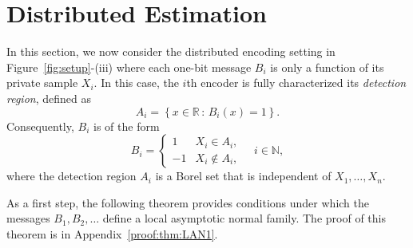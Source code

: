 \section{Distributed Estimation \label{sec:distributed}}
In this section, we now consider the distributed encoding setting in Figure~\ref{fig:setup}-(iii) where  each one-bit message $B_i$ is only a function of its private sample $X_i$. In this case, the $i$th encoder is fully characterized its \emph{detection region}, defined as 
\[
A_i = \left\{ x \in \mathbb R \,:\, B_i(x) = 1 \right\}.
\]
Consequently, $B_i$ is of the form
\[
B_i = \begin{cases} 1 & X_i \in A_i, \\
-1 & X_i \notin A_i,
\end{cases} \quad i\in \mathbb N,
\]
where the detection region $A_i$ is a Borel set that is independent of $X_1,\ldots,X_n$.\par

As a first step, the following theorem provides conditions under which the messages $B_1,B_2,\ldots$ define a local asymptotic normal family. The proof of this theorem is in Appendix~\ref{proof:thm:LAN1}. 

